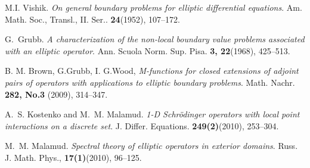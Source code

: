 \documentclass[10pt,a4paper]{article}
\begin{document}
\begin{thebibliography}{7}

M.I. Vishik. \emph{On general boundary problems for elliptic
differential equations}. {Am. Math. Soc., Transl., II. Ser.}.
\textbf{24}(1952), 107--172.

G.~Grubb. \emph{A characterization of the non-local boundary value
problems associated with an elliptic operator}.  {Ann. Scuola
Norm. Sup. Pisa}. \textbf{3, 22}(1968), 425--513.


B. M. Brown, G.Grubb, I. G.Wood, \emph{M-functions for closed
extensions of adjoint pairs of operators with applications to
elliptic boundary problems}.  {Math. Nachr.} \textbf{282, No.3}
(2009), 314--347.

A.~S. Kostenko and M.~M. Malamud. \emph{1-D Schr\"odinger
operators with local point interactions on a discrete set}. {J.
Differ. Equations}. \textbf{249(2)}(2010), 253--304.


M.~M. Malamud.  \emph{Spectral theory of elliptic operators in
exterior domains}. {Russ. J. Math. Phys.}, \textbf{17(1)}(2010),
96--125.

\end{thebibliography}
\end{document}
